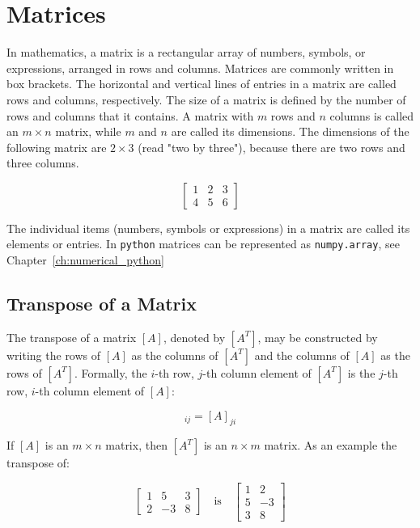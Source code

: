 \chapter{Matrices}
\label{sec:matrices}

In mathematics, a matrix is a rectangular array of numbers, symbols, or expressions, arranged in rows and columns. Matrices are commonly written in box brackets. The horizontal and vertical lines of entries in a matrix are called rows and columns, respectively. The size of a matrix is defined by the number of rows and columns that it contains. A matrix with $m$ rows and $n$ columns is called an $m\times n$ matrix, while $m$ and $n$ are called its dimensions. The dimensions of the following matrix are $2\times 3$ (read "two by three"), because there are two rows and three columns.

\begin{equation*}
\begin{bmatrix}
1 & 2 & 3\\
4 & 5 & 6
\end{bmatrix}
\end{equation*}

The individual items (numbers, symbols or expressions) in a matrix are called its elements or entries. 
In \texttt{python} matrices can be represented as \texttt{numpy.array}, see Chapter~\ref{ch:numerical_python}

\section{Transpose of a Matrix}
The transpose of a matrix $[A]$, denoted by $[A^T]$, may be constructed by writing the rows of $[A]$ as the columns of $[A^T]$
and the columns of $[A]$ as the rows of $[A^T]$.
Formally, the $i$-th row, $j$-th column element of $[A^T]$ is the $j$-th row, $i$-th column element of $[A]$:

\begin{equation}[A^T]_{ij} = [A]_{ji}\end{equation}

If $[A]$ is an $m\times n$ matrix, then $[A^T]$ is an $n\times m$ matrix. 
As an example the transpose of:

\begin{equation*}
\begin{bmatrix}
1 & 5 & 3 \\
2 & -3 & 8
\end{bmatrix}
\quad \mathrm{is} \quad
\begin{bmatrix}
1 & 2 \\
5 & -3 \\
3  & 8
\end{bmatrix}
\end{equation*}

